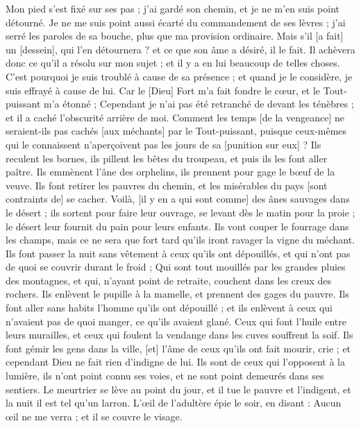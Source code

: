 \begin{multicols}{2}
Mon pied s'est fixé sur ses pas ; j'ai gardé son chemin, et je ne m'en suis point détourné.
Je ne me suis point aussi écarté du commandement de ses lèvres ; j'ai serré les paroles de sa bouche, plus que ma provision ordinaire.
Mais s'il [a fait] un [dessein], qui l'en détournera ? et ce que son âme a désiré, il le fait.
Il achèvera donc ce qu'il a résolu sur mon sujet ; et il y a en lui beaucoup de telles choses.
C'est pourquoi je suis troublé à cause de sa présence ; et quand je le considère, je suis effrayé à cause de lui.
Car le [Dieu] Fort m'a fait fondre le cœur, et le Tout-puissant m'a étonné ;
Cependant je n'ai pas été retranché de devant les ténèbres ; et il a caché l'obscurité arrière de moi.
\VerseOne{}Comment les temps [de la vengeance] ne seraient-ils pas cachés [aux méchants] par le Tout-puissant, puisque ceux-mêmes qui le connaissent n'aperçoivent pas les jours de sa [punition sur eux] ?
Ils reculent les bornes, ils pillent les bêtes du troupeau, et puis ils les font aller paître.
Ils emmènent l'âne des orphelins, ils prennent pour gage le bœuf de la veuve.
Ils font retirer les pauvres du chemin, et les misérables du pays [sont contraints de] se cacher.
Voilà, [il y en a qui sont comme] des ânes sauvages dans le désert ; ils sortent pour faire leur ouvrage, se levant dès le matin pour la proie ; le désert leur fournit du pain pour leurs enfants.
Ils vont couper le fourrage dans les champs, mais ce ne sera que fort tard qu'ils iront ravager la vigne du méchant.
Ils font passer la nuit sans vêtement à ceux qu'ils ont dépouillés, et qui n'ont pas de quoi se couvrir durant le froid ;
Qui sont tout mouillés par les grandes pluies des montagnes, et qui, n'ayant point de retraite, couchent dans les creux des rochers.
Ils enlèvent le pupille à la mamelle, et prennent des gages du pauvre.
Ils font aller sans habits l'homme qu'ils ont dépouillé ; et ils enlèvent à ceux qui n'avaient pas de quoi manger, ce qu'ils avaient glané.
Ceux qui font l'huile entre leurs murailles, et ceux qui foulent la vendange dans les cuves souffrent la soif.
Ils font gémir les gens dans la ville, [et] l'âme de ceux qu'ils ont fait mourir, crie ; et cependant Dieu ne fait rien d'indigne de lui.
Ils sont de ceux qui l'opposent à la lumière, ils n'ont point connu ses voies, et ne sont point demeurés dans ses sentiers.
Le meurtrier se lève au point du jour, et il tue le pauvre et l'indigent, et la nuit il est tel qu'un larron.
L'œil de l'adultère épie le soir, en disant : Aucun œil ne me verra ; et il se couvre le visage.

\end{multicols}
